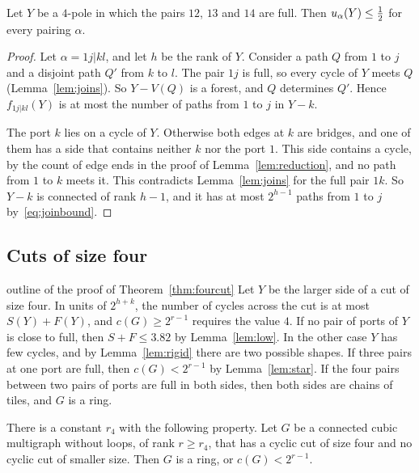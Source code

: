 \begin{lemma}\label{lem:star}
Let $Y$ be a $4$-pole in which the pairs $12$, $13$ and $14$ are full. Then
$u_\alpha(Y)\le\tfrac12$ for every pairing $\alpha$.
\end{lemma}

\begin{proof}
Let $\alpha=1j|kl$, and let $h$ be the rank of $Y$. Consider a path $Q$ from $1$ to $j$ and a
disjoint path $Q'$ from $k$ to $l$. The pair $1j$ is full, so every cycle of $Y$ meets $Q$
(Lemma~\ref{lem:joins}). So $Y-V(Q)$ is a forest, and $Q$ determines $Q'$. Hence $f_{1j|kl}(Y)$
is at most the number of paths from $1$ to $j$ in $Y-k$.

The port $k$ lies on a cycle of $Y$. Otherwise both edges at $k$ are bridges, and one of them
has a side that contains neither $k$ nor the port $1$. This side contains a cycle, by the count
of edge ends in the proof of Lemma~\ref{lem:reduction}, and no path from $1$ to $k$ meets it.
This contradicts Lemma~\ref{lem:joins} for the full pair $1k$. So $Y-k$ is connected of rank
$h-1$, and it has at most $2^{h-1}$ paths from $1$ to $j$ by~\eqref{eq:joinbound}.
\end{proof}

\subsection{Cuts of size four}

\begin{idea}{outline of the proof of Theorem~\ref{thm:fourcut}}
Let $Y$ be the larger side of a cut of size four. In units of $2^{h+k}$, the number of cycles
across the cut is at most $S(Y)+F(Y)$, and $c(G)\ge2^{r-1}$ requires the value $4$. If no pair of
ports of $Y$ is close to full, then $S+F\le3.82$ by Lemma~\ref{lem:low}. In the other case $Y$
has few cycles, and by Lemma~\ref{lem:rigid} there are two possible shapes. If three pairs at one
port are full, then $c(G)<2^{r-1}$ by Lemma~\ref{lem:star}. If the four pairs between two pairs
of ports are full in both sides, then both sides are chains of tiles, and $G$ is a ring.
\end{idea}

\begin{theorem}\label{thm:fourcut}
There is a constant $r_4$ with the following property. Let $G$ be a connected cubic multigraph
without loops, of rank $r\ge r_4$, that has a cyclic cut of size four and no cyclic cut of
smaller size. Then $G$ is a ring, or $c(G)<2^{r-1}$.
\end{theorem}

